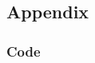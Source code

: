 \documentclass[11pt,british]{article}
\newcommand\blankpage{%
    \null
    \thispagestyle{empty}%
    \addtocounter{page}{-1}%
    \newpage}
\begin{document}

\newpage{}
\begin{landscape}
\part{Appendix}
\section*{Code}

\end{landscape}



\afterpage{\blankpage}
\end{document}
